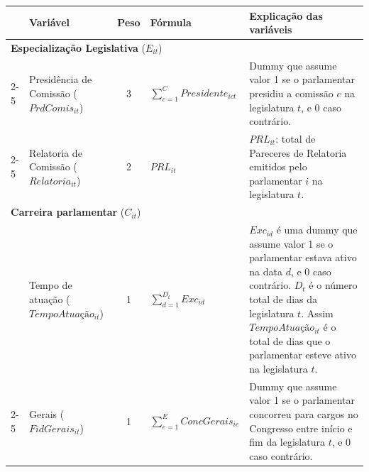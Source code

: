 \label{tab:ipp_vars}
\begin{tabular}{|p{.3cm}|p{3.5cm}|c|p{3.0cm}|p{6cm}|}
\hline
\textbf{} & \textbf{Variável} & \textbf{Peso} & \textbf{Fórmula} & \textbf{Explicação das variáveis} \\
\hline
\multicolumn{5}{|l|}{\textbf{Especialização Legislativa} ($E_{it}$)} \\
\hline
\cline{2-5}
\cline{2-5}
& Presidência de Comissão ($PrdComis_{it}$) & 3 & $\sum\limits_{c=1}^{C} Presidente_{ict}$ & Dummy que assume valor 1 se o parlamentar presidiu a comissão $c$ na legislatura $t$, e 0 caso contrário. \\
\cline{2-5}
& Relatoria de Comissão ($Relatoria_{it}$) & 2 & $PRL_{it}$ & $PRL_{it}$: total de Pareceres de Relatoria emitidos pelo parlamentar $i$ na legislatura $t$. \\
\hline
\multicolumn{5}{|l|}{\textbf{Carreira parlamentar} ($C_{it}$)} \\
\hline
& Tempo de atuação ($TempoAtuação_{it}$) & 1 & $\sum\limits_{d=1}^{D_t} Exc_{id}$ & $Exc_{id}$ é uma dummy que assume valor 1 se o parlamentar estava ativo na data $d$, e 0 caso contrário. $D_t$ é o número total de dias da legislatura $t$. Assim $TempoAtuação_{it}$ é o total de dias que o parlamentar esteve ativo na legislatura $t$. \\
\cline{2-5}
& Gerais ($FidGerais_{it}$) & 1 & $\sum\limits_{e=1}^{E} ConcGerais_{ie}$ & Dummy que assume valor 1 se o parlamentar concorreu para cargos no Congresso entre início e fim da legislatura $t$, e 0 caso contrário. \\
\hline
\end{tabular}

